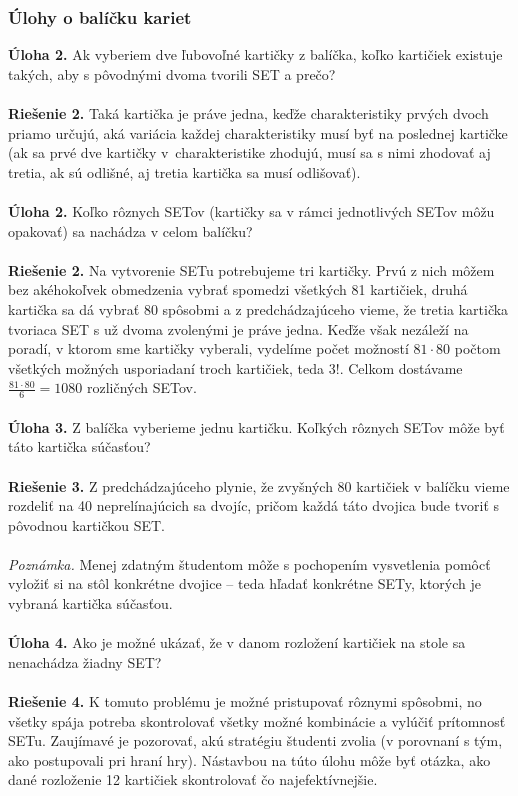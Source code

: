 \documentclass[11pt,a4paper,oneside,final]{book}
\begin{document}
\subsubsection*{Úlohy o balíčku kariet}
\textbf{Úloha 2.} Ak vyberiem dve ľubovoľné kartičky z balíčka, koľko kartičiek existuje takých, aby s pôvodnými dvoma tvorili SET a prečo?\\
\\
\textbf{Riešenie 2.} Taká kartička je práve jedna, keďže charakteristiky prvých dvoch priamo určujú, aká variácia každej charakteristiky musí byť na poslednej kartičke (ak sa prvé dve kartičky v~charakteristike zhodujú, musí sa s nimi zhodovať aj tretia, ak sú odlišné, aj tretia kartička sa musí odlišovať).\\
\\
\textbf{Úloha 2.} Koľko rôznych SETov (kartičky sa v rámci jednotlivých SETov môžu opakovať) sa nachádza v celom balíčku?\\
\\
\textbf{Riešenie 2.} Na vytvorenie SETu potrebujeme tri kartičky. Prvú z nich môžem bez akéhokoľvek obmedzenia vybrať spomedzi všetkých 81 kartičiek, druhá kartička sa dá vybrať 80 spôsobmi a z predchádzajúceho vieme, že tretia kartička tvoriaca SET s už dvoma zvolenými je práve jedna. Keďže však nezáleží na poradí, v ktorom sme kartičky vyberali, vydelíme počet možností $81\cdot80$ počtom všetkých možných usporiadaní troch kartičiek, teda $3!$. Celkom dostávame $\frac{81\cdot80}{6}=1080$ rozličných SETov.\\
\\
\textbf{Úloha 3.} Z balíčka vyberieme jednu kartičku. Koľkých rôznych SETov môže byť táto kartička súčasťou? \\
\\
\textbf{Riešenie 3.} Z predchádzajúceho plynie, že zvyšných 80 kartičiek v balíčku vieme rozdeliť na 40 neprelínajúcich sa dvojíc, pričom každá táto dvojica bude tvoriť s pôvodnou kartičkou SET.\\
\\
\textit{Poznámka.} Menej zdatným študentom môže s pochopením vysvetlenia pomôcť vyložiť si na stôl konkrétne dvojice -- teda hľadať konkrétne SETy, ktorých je vybraná kartička súčasťou. \\
\\
\textbf{Úloha 4.} Ako je možné ukázať, že v danom rozložení kartičiek na stole sa nenachádza žiadny SET?\\
\\
\textbf{Riešenie 4.} K tomuto problému je možné pristupovať rôznymi spôsobmi, no všetky spája potreba skontrolovať všetky možné kombinácie a vylúčiť prítomnosť SETu. Zaujímavé je pozorovať, akú stratégiu študenti zvolia (v porovnaní s tým, ako postupovali pri hraní hry).  Nástavbou na túto úlohu môže byť otázka, ako dané rozloženie 12 kartičiek  skontrolovať čo najefektívnejšie.\\
\\
\end{document}
